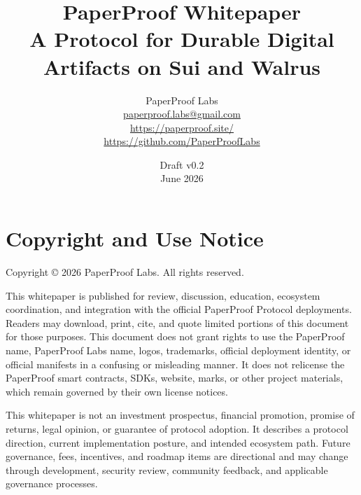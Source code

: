\documentclass[11pt]{article}
\title{\textbf{PaperProof Whitepaper}\\
\large A Protocol for Durable Digital Artifacts on Sui and Walrus}
\author{PaperProof Labs\\
\href{mailto:paperproof.labs@gmail.com}{paperproof.labs@gmail.com}\\
\href{https://paperproof.site/}{https://paperproof.site/}\\
\href{https://github.com/PaperProofLabs}{https://github.com/PaperProofLabs}}
\date{Draft v0.2 \\ June 2026}
\begin{document}
\maketitle

\section*{Copyright and Use Notice}

Copyright \copyright{} 2026 PaperProof Labs. All rights reserved.

This whitepaper is published for review, discussion, education, ecosystem
coordination, and integration with the official PaperProof Protocol deployments.
Readers may download, print, cite, and quote limited portions of this document
for those purposes. This document does not grant rights to use the PaperProof
name, PaperProof Labs name, logos, trademarks, official deployment identity, or
official manifests in a confusing or misleading manner. It does not relicense
the PaperProof smart contracts, SDKs, website, marks, or other project
materials, which remain governed by their own license notices.

This whitepaper is not an investment prospectus, financial promotion, promise of
returns, legal opinion, or guarantee of protocol adoption. It describes a
protocol direction, current implementation posture, and intended ecosystem path.
Future governance, fees, incentives, and roadmap items are directional and may
change through development, security review, community feedback, and applicable
governance processes.
\end{document}
